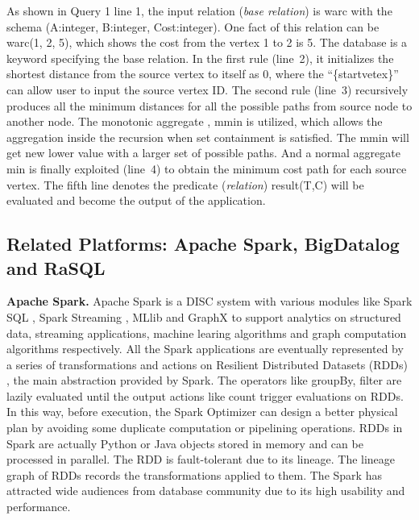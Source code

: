 As shown in Query 1 line 1, the input relation (\textit{base relation}) is \textsf{warc} with the schema \textsf{(A:integer, B:integer, Cost:integer)}. 
One fact of this relation can be \textsf{warc(1, 2, 5)}, which shows the  cost from   the vertex 1 to 2 is 5. The \textsf{database} is a keyword specifying the base relation.
In the first rule (line~2), it initializes the shortest distance from the source vertex to itself as 0, where the ``\{startvetex\}'' can allow user to input the source vertex ID. The second rule (line~3) recursively produces all the minimum distances for all the possible paths from source node to another node. The monotonic aggregate \citep{zaniolo2019monotonic,das2019bigdata}, \textsf{mmin} is utilized, which allows the aggregation inside the recursion when set containment is satisfied. The \textsf{mmin} will get new lower value with a larger set of possible paths. And a normal aggregate \textsf{min} is finally exploited (line~4) to obtain the minimum cost path for each source vertex. The fifth line denotes the  predicate (\textit{relation}) \textsf{result(T,C)} will be evaluated and become the output of the application.

\subsection{Related Platforms: Apache Spark, BigDatalog and RaSQL}
\textbf{Apache Spark.} Apache Spark is a DISC system with various modules like Spark SQL \citep{sparksql}, Spark Streaming \citep{sparkstreaming}, MLlib \citep{meng2016mllib} and GraphX \citep{gonzalez2014graphx} to support analytics on structured data, streaming applications, machine learing algorithms and graph computation algorithms respectively.  All the Spark applications are eventually represented by a series of transformations and actions on Resilient Distributed Datasets (RDDs) \citep{dean2004mapreduce}, the main abstraction provided by Spark. The operators like groupBy, filter are lazily evaluated until the output actions like count trigger evaluations on RDDs. In this way, before execution, the Spark Optimizer can design a better physical plan by avoiding some duplicate computation or pipelining operations. RDDs in Spark are actually Python or Java objects stored in memory and can be processed in parallel. The RDD is fault-tolerant due to its lineage. The lineage graph of RDDs records the transformations applied to them.  The Spark has attracted wide audiences from database community due to its high usability and performance.

